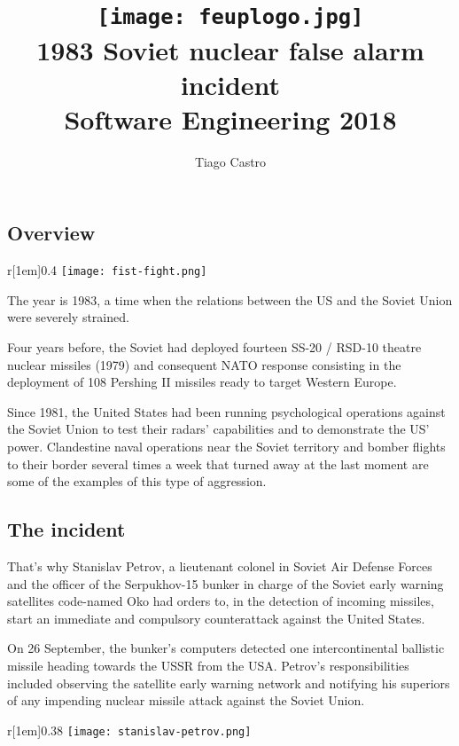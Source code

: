 \documentclass[12pt,a4paper,notitlepage]{article}
\title{
	\vspace{-2\baselineskip}
	\texttt{[image: feuplogo.jpg]}\\
	{\Huge 1983 Soviet nuclear false alarm incident}\\
	{\normalsize Software Engineering 2018}
}
\author{
	Tiago Castro\\ \text{up201606186}
}
\begin{document}
\maketitle
\thispagestyle{empty}

\subsection{Overview}

\begin{wrapfigure}[11]{r}[1em]{0.4\textwidth}
	\vspace{-\baselineskip}
	\texttt{[image: fist-fight.png]}
\end{wrapfigure}

The year is 1983, a time when the relations between the US and the Soviet Union were severely strained.

Four years before, the Soviet had deployed fourteen SS-20 / RSD-10 theatre nuclear missiles (1979) and consequent NATO response consisting in the deployment of 108 Pershing II missiles ready to target Western  Europe.

Since 1981, the United States had been running psychological operations against the Soviet Union to test their radars’ capabilities and to demonstrate the US’ power.
Clandestine naval operations near the Soviet territory and bomber flights to their border several times a week that turned away at the last moment are some of the examples of this type of aggression.

\subsection{The incident}

That’s why Stanislav Petrov, a lieutenant colonel in Soviet Air Defense Forces and the officer of the Serpukhov-15 bunker in charge of the Soviet early warning satellites code-named Oko had orders to, in the detection of incoming missiles, start an immediate and compulsory counterattack against the United States.

On 26 September, the bunker’s computers detected one intercontinental ballistic missile heading towards the USSR from the USA.
Petrov's responsibilities included observing the satellite early warning network and notifying his superiors of any impending nuclear missile attack against the Soviet Union.

\begin{wrapfigure}[12]{r}[1em]{0.38\textwidth}
	\vspace{-\baselineskip}
	\texttt{[image: stanislav-petrov.png]}
\end{wrapfigure}
\end{document}
